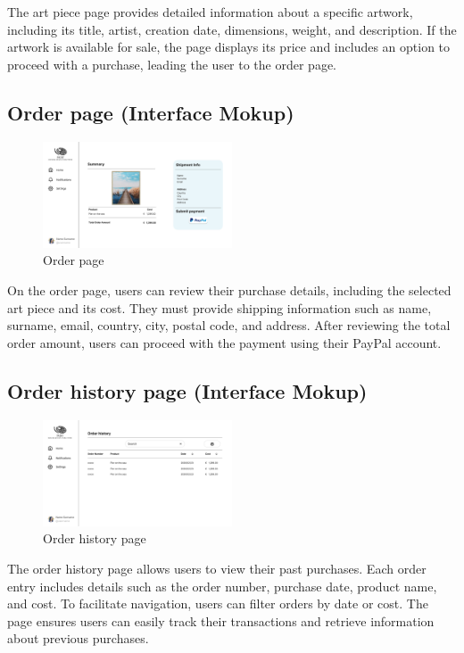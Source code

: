 The art piece page provides detailed information about a specific artwork, including its title, artist, creation date, dimensions, weight, and description. If the artwork is available for sale, the page displays its price and includes an option to proceed with a purchase, leading the user to the order page.


\subsection{Order page (Interface Mokup)}
\begin{figure}[H]
    \centering
    \includegraphics[width=0.5\textwidth]{images/interface_mockups/Order page.pdf}
    \caption{Order page}
\end{figure}

On the order page, users can review their purchase details, including the selected art piece and its cost. They must provide shipping information such as name, surname, email, country, city, postal code, and address. After reviewing the total order amount, users can proceed with the payment using their PayPal account.


\subsection{Order history page (Interface Mokup)}
\begin{figure}[H]
    \centering
    \includegraphics[width=0.5\textwidth]{images/interface_mockups/Order History.pdf}
    \caption{Order history page}
\end{figure}

The order history page allows users to view their past purchases. Each order entry includes details such as the order number, purchase date, product name, and cost. To facilitate navigation, users can filter orders by date or cost. The page ensures users can easily track their transactions and retrieve information about previous purchases.